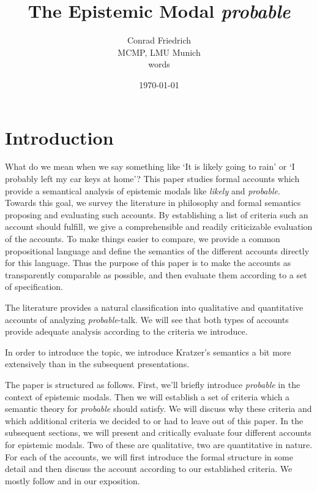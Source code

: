 \documentclass{article}
\title{The Epistemic Modal \emph{probable}}
\author{Conrad Friedrich \\ MCMP, LMU Munich \\ \wordcount words}
\date{\today}
\theoremstyle{definition}
\begin{document}
\onehalfspacing

\maketitle

\tableofcontents
\section{Introduction}

What do we mean when we say something like `It is likely going to rain' or `I probably left my car keys at home'?
This paper studies formal accounts which provide a semantical analysis of epistemic modals like \emph{likely} and \emph{probable}.
Towards this goal, we survey the literature in philosophy and formal semantics proposing and evaluating such accounts.
By establishing a list of criteria such an account should fulfill, we give a comprehensible and readily criticizable evaluation of the accounts. To make things easier to compare, we provide a common propositional language and define the semantics of the different accounts directly for this language. Thus the purpose of this paper is to make the accounts as transparently comparable as possible, and then evaluate them according to a set of specification.

The literature provides a natural classification into qualitative and quantitative accounts of analyzing \emph{probable}-talk. We will see that both types of accounts provide adequate analysis according to the criteria we introduce.

In order to introduce the topic, we introduce Kratzer's semantics a bit more extensively than in the subsequent presentations.

The paper is structured as follows. First, we'll briefly introduce \emph{probable} in the context of epistemic modals. Then we will establish a set of criteria which a semantic theory for \emph{probable} should satisfy. We will discuss why these criteria and which additional criteria we decided to or had to leave out of this paper. In the subsequent sections, we will present and critically evaluate four different accounts for epistemic modals. Two of these are qualitative, two are quantitative in nature. For each of the accounts, we will first introduce the formal structure in some detail and then discuss the account according to our established criteria. We mostly follow \textcite{yalcin10_probab_operat} and \textcite{holliday13_measur} in our exposition.
\end{document}
